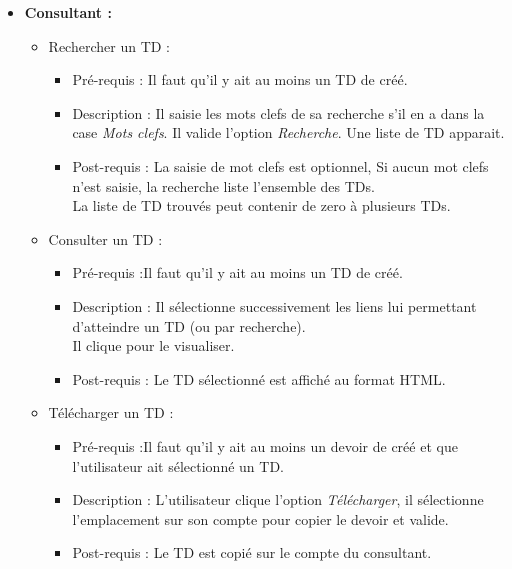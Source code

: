 	\begin{itemize}
	\item {\bf Consultant :}\\
		\begin{itemize}
		\item Rechercher un TD :
			\begin{itemize}
			\item Pr{\'e}-requis : Il faut qu'il y ait au moins un TD de cr{\'e}{\'e}.
			\item Description : Il saisie les mots clefs de sa recherche s'il en a dans la case {\it Mots clefs}.
			Il valide l'option {\it Recherche}.
			Une liste de TD apparait.
			\item Post-requis : La saisie de mot clefs est optionnel, Si aucun mot clefs n'est saisie, la recherche liste l'ensemble des TDs.\\
			La liste de TD trouv{\'e}s peut contenir de zero {\`a} plusieurs TDs.\\
			\end{itemize}
		\item Consulter un TD :
			\begin{itemize}
			\item Pr{\'e}-requis :Il faut qu'il y ait au moins un TD de cr{\'e}{\'e}.
			\item Description : Il s{\'e}lectionne successivement les liens lui permettant d'atteindre un TD (ou par recherche).\\
			Il clique pour le visualiser.
			\item Post-requis : Le TD s{\'e}lectionn{\'e} est affich{\'e} au format HTML.\\
			\end{itemize}
			
		\item T{\'e}l{\'e}charger un TD :
			\begin{itemize}
			\item Pr{\'e}-requis :Il faut qu'il y ait au moins un devoir de cr{\'e}{\'e} et que l'utilisateur ait s{\'e}lectionn{\'e} un TD.
			\item Description : L'utilisateur clique l'option {\it T{\'e}l{\'e}charger}, il s{\'e}lectionne l'emplacement sur son compte pour copier le devoir et valide.
			\item Post-requis : Le TD est copi{\'e} sur le compte du consultant.\\
			\end{itemize}
		\end{itemize}
	\end{itemize}

